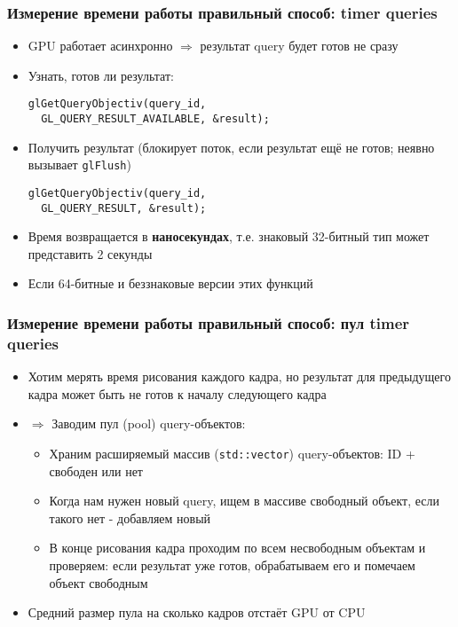 \documentclass{beamer}
\begin{document}
\begin{frame}[fragile]
\frametitle{Измерение времени работы \textendash{} правильный способ: timer queries}
\begin{itemize}
\item GPU работает асинхронно \begin{math}\Rightarrow\end{math} результат query будет готов не сразу
\pause
\item Узнать, готов ли результат:
\begin{verbatim}
glGetQueryObjectiv(query_id,
  GL_QUERY_RESULT_AVAILABLE, &result);
\end{verbatim}
\pause
\item Получить результат (блокирует поток, если результат ещё не готов; неявно вызывает \verb|glFlush|)
\begin{verbatim}
glGetQueryObjectiv(query_id,
  GL_QUERY_RESULT, &result);
\end{verbatim}
\pause
\item Время возвращается в \textbf{наносекундах}, т.е. знаковый 32-битный тип может представить 2 секунды
\pause
\item Если 64-битные и беззнаковые версии этих функций
\end{itemize}
\end{frame}

\begin{frame}[fragile]
\frametitle{Измерение времени работы \textendash{} правильный способ: пул timer queries}
\begin{itemize}
\item Хотим мерять время рисования каждого кадра, но результат для предыдущего кадра может быть не готов к началу следующего кадра
\pause
\item \begin{math}\Rightarrow\end{math} Заводим пул (pool) query-объектов:
\pause
\begin{itemize}
\item Храним расширяемый массив (\verb|std::vector|) query-объектов: ID + свободен или нет
\pause
\item Когда нам нужен новый query, ищем в массиве свободный объект, если такого нет - добавляем новый
\pause
\item В конце рисования кадра проходим по всем несвободным объектам и проверяем: если результат уже готов, обрабатываем его и помечаем объект свободным
\end{itemize}
\pause
\item Средний размер пула \textendash{} на сколько кадров отстаёт GPU от CPU
\end{itemize}
\end{frame}
\end{document}
